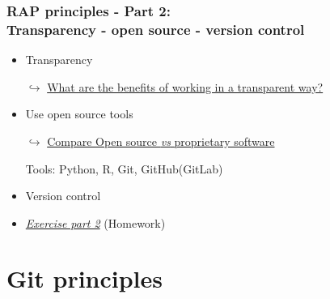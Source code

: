 \documentclass[xcolor=x11names,compress]{beamer}
\renewcommand{\(}{\begin{columns}}
\renewcommand{\)}{\end{columns}}
\newcommand{\<}[1]{\begin{column}{#1}}
\renewcommand{\>}{\end{column}}
\begin{document}
\begin{frame}[<+->]
   \frametitle{RAP principles - Part 2:  \\Transparency - open source - version control }
   \pause
    \begin{itemize}[<+->]
      \item Transparency
     \item[$\hookrightarrow$]\href{https://sergegoussev.github.io/ESCAP_RAP_class/docs/teaching_materials/sept_18/sept_18_session.html\#principle-3-transparency}{What are the benefits of working in a transparent way? }
     \item Use open source tools
      \item[$\hookrightarrow$]\href{https://sergegoussev.github.io/ESCAP_RAP_class/docs/teaching_materials/sept_18/sept_18_session.html\#practical-set-two}{Compare Open source \emph{vs} proprietary software }
     \item[Tools:] Python, R, Git, GitHub(GitLab)
     \item Version control
     \item \href{https://sergegoussev.github.io/ESCAP_RAP_class/docs/teaching_materials/sept_18/sept_18_session.html\#exercise-2-on-your-own}{\emph{Exercise part 2}} (Homework)
    \end{itemize}
\end{frame}

\section{Git principles}
\end{document}
